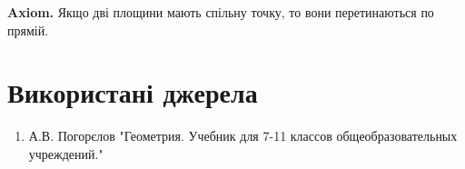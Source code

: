 \documentclass[a4paper, 10pt]{article}
\theoremstyle{theoremdd}
\theoremstyle{theoremdd}
\theoremstyle{theoremdd}
\newtheorem{definition}[theorem]{Definition}
\theoremstyle{theoremdd}
\theoremstyle{theoremdd}
\theoremstyle{theoremdd}
\theoremstyle{theoremdd}
\theoremstyle{theoremdd}
\theoremstyle{theoremdd}
\begin{document}
\textbf{Axiom.} Якщо дві площини мають спільну точку, то вони перетинаються по прямій.

\newpage
\fi

\section*{Використані джерела}
\begin{enumerate}
\item А.В. Погорєлов "Геометрия. Учебник для 7-11 классов общеобразовательных учреждений."
\end{enumerate}
\end{document}
